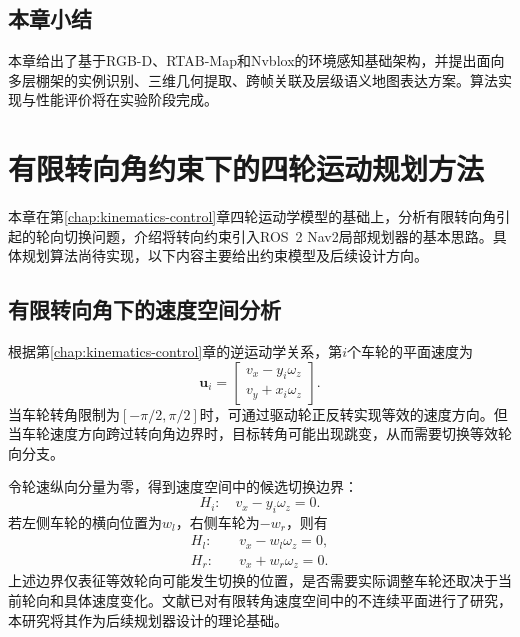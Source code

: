 \documentclass[UTF8,12pt,a4paper,openany]{ctexbook}
\begin{document}
\section{本章小结}

本章给出了基于RGB-D、RTAB-Map和Nvblox的环境感知基础架构，并提出面向多层棚架的实例识别、三维几何提取、跨帧关联及层级语义地图表达方案。算法实现与性能评价将在实验阶段完成。


\chapter{有限转向角约束下的四轮运动规划方法}
\label{chap:steering-planning}

本章在第\ref{chap:kinematics-control}章四轮运动学模型的基础上，分析有限转向角引起的轮向切换问题，介绍将转向约束引入ROS~2 Nav2局部规划器的基本思路。具体规划算法尚待实现，以下内容主要给出约束模型及后续设计方向。

\section{有限转向角下的速度空间分析}

根据第\ref{chap:kinematics-control}章的逆运动学关系，第$i$个车轮的平面速度为
\begin{equation}
\boldsymbol{u}_i=
\begin{bmatrix}
 v_x-y_i\omega_z\\
 v_y+x_i\omega_z
\end{bmatrix}.
\label{eq:pl-wheel-velocity}
\end{equation}
当车轮转角限制为$[-\pi/2,\pi/2]$时，可通过驱动轮正反转实现等效的速度方向。但当车轮速度方向跨过转向角边界时，目标转角可能出现跳变，从而需要切换等效轮向分支。

令轮速纵向分量为零，得到速度空间中的候选切换边界：
\begin{equation}
H_i:\quad v_x-y_i\omega_z=0.
\label{eq:pl-switch-boundary}
\end{equation}
若左侧车轮的横向位置为$w_l$，右侧车轮为$-w_r$，则有
\begin{equation}
\begin{aligned}
H_l:&\quad v_x-w_l\omega_z=0,\\
H_r:&\quad v_x+w_r\omega_z=0.
\end{aligned}
\label{eq:pl-switch-planes}
\end{equation}
上述边界仅表征等效轮向可能发生切换的位置，是否需要实际调整车轮还取决于当前轮向和具体速度变化。文献\cite{liu2025constrained}已对有限转角速度空间中的不连续平面进行了研究，本研究将其作为后续规划器设计的理论基础。
\end{document}
